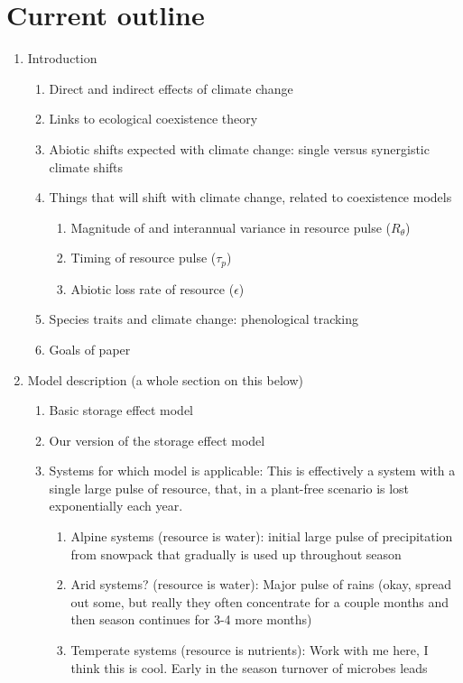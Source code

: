 \documentclass[11pt,a4paper,oneside]{article}
\begin{document}
\section{Current outline}
\begin{enumerate}
\item Introduction
\begin{enumerate}
\item Direct and indirect effects of climate change
\item Links to ecological coexistence theory
\item Abiotic shifts expected with climate change: single versus
  synergistic climate shifts
\item Things that will shift with climate change, related to
  coexistence models
\begin{enumerate}
\item Magnitude of and interannual variance in resource pulse (\(R_{\theta}\))
\item Timing of resource pulse (\(\tau_{p}\))
\item Abiotic loss rate of resource (\(\epsilon\))
\end{enumerate}
\item Species traits and climate change: phenological tracking
\item Goals of paper
\end{enumerate}
\item Model description (a whole section on this below)
\begin{enumerate}
\item Basic storage effect model
\item Our version of the storage effect model
\item Systems for which model is applicable: This is effectively a system with a single large pulse of
resource, that, in a plant-free scenario is lost exponentially each
year. 
\begin{enumerate}
\item Alpine systems (resource is water): initial large pulse of precipitation from
  snowpack that gradually is used up  throughout season
\item Arid systems? (resource is water): Major pulse of rains (okay, spread out some,
  but really they often concentrate for a couple months and then
  season continues for 3-4 more months)
\item Temperate systems (resource is nutrients): Work with me here, I
  think this is cool. Early in the season turnover of microbes leads

\end{enumerate}
\end{enumerate}
\end{enumerate}
\end{document}
